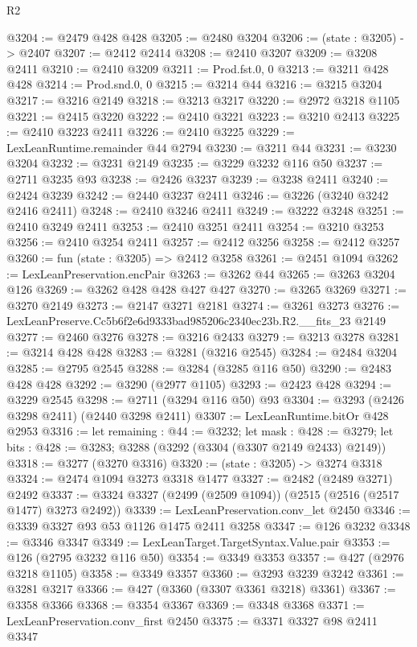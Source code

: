 \begin{lexlean}{R2}
\begin{coremodule}
@3204 := @2479 @428 @428
@3205 := @2480 @3204
@3206 := (state : @3205) -> @2407
@3207 := @2412 @2414
@3208 := @2410 @3207
@3209 := @3208 @2411
@3210 := @2410 @3209
@3211 := Prod.fst.{0, 0}
@3213 := @3211 @428 @428
@3214 := Prod.snd.{0, 0}
@3215 := @3214 @44
@3216 := @3215 @3204
@3217 := @3216 @2149
@3218 := @3213 @3217
@3220 := @2972 @3218 @1105
@3221 := @2415 @3220
@3222 := @2410 @3221
@3223 := @3210 @2413
@3225 := @2410 @3223 @2411
@3226 := @2410 @3225
@3229 := LexLeanRuntime.remainder @44 @2794
@3230 := @3211 @44
@3231 := @3230 @3204
@3232 := @3231 @2149
@3235 := @3229 @3232 @116 @50
@3237 := @2711 @3235 @93
@3238 := @2426 @3237
@3239 := @3238 @2411
@3240 := @2424 @3239
@3242 := @2440 @3237 @2411
@3246 := @3226 (@3240 @3242 @2416 @2411)
@3248 := @2410 @3246 @2411
@3249 := @3222 @3248
@3251 := @2410 @3249 @2411
@3253 := @2410 @3251 @2411
@3254 := @3210 @3253
@3256 := @2410 @3254 @2411
@3257 := @2412 @3256
@3258 := @2412 @3257
@3260 := fun (state : @3205) => @2412 @3258
@3261 := @2451 @1094
@3262 := LexLeanPreservation.encPair
@3263 := @3262 @44
@3265 := @3263 @3204 @126
@3269 := @3262 @428 @428 @427 @427
@3270 := @3265 @3269
@3271 := @3270 @2149
@3273 := @2147 @3271 @2181
@3274 := @3261 @3273
@3276 := LexLeanPreserve.Cc5b6f2e6d9333bad985206c2340ec23b.R2.__fits_23 @2149
@3277 := @2460 @3276
@3278 := @3216 @2433
@3279 := @3213 @3278
@3281 := @3214 @428 @428
@3283 := @3281 (@3216 @2545)
@3284 := @2484 @3204
@3285 := @2795 @2545
@3288 := @3284 (@3285 @116 @50)
@3290 := @2483 @428 @428
@3292 := @3290 (@2977 @1105)
@3293 := @2423 @428
@3294 := @3229 @2545
@3298 := @2711 (@3294 @116 @50) @93
@3304 := @3293 (@2426 @3298 @2411) (@2440 @3298 @2411)
@3307 := LexLeanRuntime.bitOr @428 @2953
@3316 := let remaining : @44 := @3232;
  let mask : @428 := @3279;
  let bits : @428 := @3283; @3288 (@3292 (@3304 (@3307 @2149 @2433) @2149))
@3318 := @3277 (@3270 @3316)
@3320 := (state : @3205) -> @3274 @3318
@3324 := @2474 @1094 @3273 @3318 @1477
@3327 := @2482 (@2489 @3271) @2492
@3337 := @3324 @3327 (@2499 (@2509 @1094)) (@2515 (@2516 (@2517 @1477) @3273 @2492))
@3339 := LexLeanPreservation.conv_let @2450
@3346 := @3339 @3327 @93 @53 @1126 @1475 @2411 @3258
@3347 := @126 @3232
@3348 := @3346 @3347
@3349 := LexLeanTarget.TargetSyntax.Value.pair
@3353 := @126 (@2795 @3232 @116 @50)
@3354 := @3349 @3353
@3357 := @427 (@2976 @3218 @1105)
@3358 := @3349 @3357
@3360 := @3293 @3239 @3242
@3361 := @3281 @3217
@3366 := @427 (@3360 (@3307 @3361 @3218) @3361)
@3367 := @3358 @3366
@3368 := @3354 @3367
@3369 := @3348 @3368
@3371 := LexLeanPreservation.conv_first @2450
@3375 := @3371 @3327 @98 @2411 @3347

\end{coremodule}
\end{lexlean}
